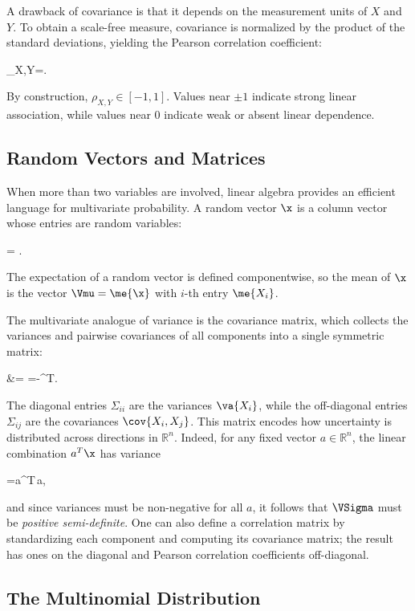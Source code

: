 A drawback of covariance is that it depends on the measurement units of $X$ and $Y$. To obtain a scale-free measure, covariance is normalized by the product of the standard deviations, yielding the \alert{Pearson correlation coefficient}:
\begin{myequation}
\rho_{X,Y}=.
\end{myequation}
By construction, $\rho_{X,Y}\in[-1,1]$. Values near $\pm 1$ indicate strong linear association, while values near $0$ indicate weak or absent linear dependence.

\subsection*{Random Vectors and Matrices}

When more than two variables are involved, linear algebra provides an efficient language for multivariate probability. A \alert{random vector} $\x$ is a column vector whose entries are random variables:
\begin{myequation}
\x=
.
\end{myequation}
The expectation of a random vector is defined componentwise, so the mean of $\x$ is the vector $\Vmu = \me{\x}$ with $i$-th entry $\me{X_i}$.

The multivariate analogue of variance is the \alert{covariance matrix}, which collects the variances and pairwise covariances of all components into a single symmetric matrix:
\begin{myalign}
\VSigma
&=
=-\Vmu\Vmu^T.
\end{myalign}
The diagonal entries $\Sigma_{ii}$ are the variances $\va{X_i}$, while the off-diagonal entries $\Sigma_{ij}$ are the covariances $\cov{X_i,X_j}$. This matrix encodes how uncertainty is distributed across directions in $\mathbb{R}^n$. Indeed, for any fixed vector $a\in\mathbb{R}^n$, the linear combination $a^T\x$ has variance
\begin{myequation}
=a^T\VSigma\,a,
\end{myequation}
and since variances must be non-negative for all $a$, it follows that $\VSigma$ must be \emph{positive semi-definite}. One can also define a \alert{correlation matrix} by standardizing each component and computing its covariance matrix; the result has ones on the diagonal and Pearson correlation coefficients off-diagonal.

\subsection*{The Multinomial Distribution}

